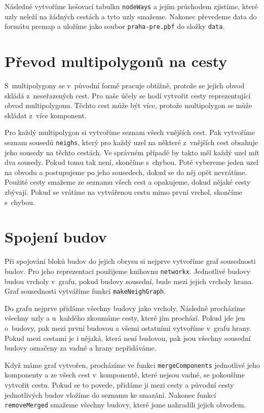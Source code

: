 Následně vytvoříme hešovací tabulku \verb|nodeWays| a jejím průchodem zjistíme, které
uzly neleží na žádných cestách a tyto uzly smažeme. Nakonec převedeme data do
formátu premap a uložíme jako soubor \verb|praha-pre.pbf| do složky \verb|data|.

\section{Převod multipolygonů na cesty}
S~multipolygony se v~původní formě pracuje obtížně, protože se jejich obvod
skládá z~neseřazených cest. Pro naše účely se hodí vytvořit cesty reprezentující
obvod multipolygonu. Těchto cest může být více, protože multipolygon se může
skládat z~více komponent. 

Pro každý multipolygon si vytvoříme seznam všech vnějších cest. Pak vytvoříme
seznam sousedů \verb|neighs|, který pro každý uzel na některé z~vnějších cest
obsahuje jeho sousedy na těchto cestách. Ve správném případě by takto měl každý
uzel mít dva sousedy. Pokud tomu tak není, skončíme s~chybou. Poté vybereme
jeden uzel na obvodu a postupujeme po jeho sousedech, dokud se do něj opět
nevrátíme. Použité cesty smažeme ze seznamu všech cest a opakujeme, dokud nějaké
cesty zbývají. Pokud se vrátíme na vytvářenou cestu mimo první vrchol, skončíme
s~chybou.

\section{Spojení budov}
Při spojování bloků budov do jejich obrysu si nejprve vytvoříme graf sousednosti
budov. Pro jeho reprezentaci použijeme knihovnu \verb|networkx|. Jednotlivé
budovy budou vrcholy v~grafu, pokud budovy sousední, bude mezi jejich vrcholy
hrana. Graf sousednosti vytváříme funkcí \verb|makeNeighGraph|.

Do grafu nejprve přidáme všechny budovy jako vrcholy. Následně procházíme
všechny uzly a u~každého zkoumáme cesty, které jím prochází. Pokud jde jen
o~budovy, pak mezi první budovou a všemi ostatními vytvoříme v~grafu hrany. Pokud
mezi cestami je i nějaká, která není budovou, pak jsou všechny sousední budovy
označeny za vadné a hrany nepřidáváme.

Když máme graf vytvořen, procházíme ve funkci \verb|mergeComponents| jednotlivé
jeho komponenty a ze všech cest v~komponentě, které nejsou vadné, se pokoušíme
vytvořit cestu. Pokud se to povede, přidáme ji mezi cesty a původní cesty
jednotlivých budov vložíme do seznamu ke smazání. Nakonec funkcí
\verb|removeMerged| smažeme všechny budovy, které jsme nahradili jejich obvodem.

